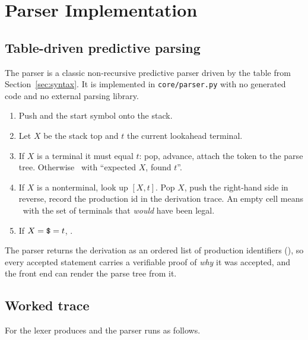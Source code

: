 \section{Parser Implementation}\label{sec:parser}

\subsection{Table-driven predictive parsing}

The parser is a classic non-recursive predictive parser driven by the table from
Section~\ref{sec:syntax}. It is implemented in \texttt{core/parser.py} with no generated
code and no external parsing library.

\begin{enumerate}[leftmargin=1.4em, itemsep=0.15em]
  \item Push \term{\$} and the start symbol  onto the stack.
  \item Let $X$ be the stack top and $t$ the current lookahead terminal.
  \item If $X$ is a terminal it must equal $t$: pop, advance, attach the token to the
        parse tree. Otherwise \rejected\ with ``expected $X$, found $t$''.
  \item If $X$ is a nonterminal, look up $[X, t]$. Pop $X$, push the right-hand side in
        reverse, record the production id in the derivation trace. An empty cell means
        \rejected\ with the set of terminals that \emph{would} have been legal.
  \item If $X = \texttt{\$} = t$, \accepted.
\end{enumerate}

The parser returns the derivation as an ordered list of production identifiers
(), so every accepted statement carries a verifiable proof of \emph{why} it was
accepted, and the front end can render the parse tree from it.


\subsection{Worked trace}

For  the lexer produces  and the
parser runs as follows.

